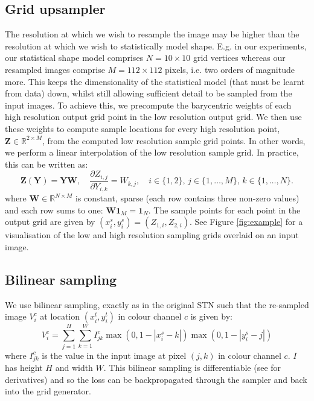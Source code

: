 \documentclass[runningheads]{llncs}
\newcommand{\R}{\mathbb{R}}
\begin{document}
\subsection{Grid upsampler}

The resolution at which we wish to resample the image may be higher than the resolution at which we wish to statistically model shape. E.g. in our experiments, our statistical shape model comprises $N = 10\times 10$ grid vertices whereas our resampled images comprise $M = 112\times 112$ pixels, i.e. two orders of magnitude more. This keeps the dimensionality of the statistical model (that must be learnt from data) down, whilst still allowing sufficient detail to be sampled from the input images. To achieve this, we precompute the barycentric weights of each high resolution output grid point in the low resolution output grid. We then use these weights to compute sample locations for every high resolution point, $\mathbf{Z}\in\R^{2\times M}$, from the computed low resolution sample grid points. In other words, we perform a linear interpolation of the low resolution sample grid. In practice, this can be written as:
\begin{equation}
    \mathbf{Z}(\mathbf{Y}) = \mathbf{YW},\quad  \frac{\partial Z_{i,j}}{\partial Y_{i,k}}=W_{k,j},\quad i\in\{1,2\},\, j\in\{1,\dots,M\},\, k\in\{1,\dots,N\}.
\end{equation}
where $\mathbf{W}\in\R^{N\times M}$ is constant, sparse (each row contains three non-zero values) and each row sums to one: $\mathbf{W1}_M=\mathbf{1}_N$.
The sample points for each point in the output grid are given by $(x_i^s,y_i^s)=(Z_{1,i},Z_{2,i})$. See Figure \ref{fig:example} for a visualisation of the low and high resolution sampling grids overlaid on an input image.

\subsection{Bilinear sampling}
We use bilinear sampling, exactly as in the original STN such that the re-sampled image $V_i^c$ at location $(x_i^t,y_i^t)$ in colour channel $c$ is given by:
\begin{equation*}
    V_i^c = \sum_{j=1}^H\sum_{k=1}^W I_{jk}^c \max(0,1-|x_i^s-k|)\max(0,1-|y_i^s-j|)
\end{equation*}
where $I_{jk}^c$ is the value in the input image at pixel $(j,k)$ in colour channel $c$. $I$ has height $H$ and width $W$. This bilinear sampling is differentiable (see \cite{jaderberg2015spatial} for derivatives) and so the loss can be backpropagated through the sampler and back into the grid generator.
\end{document}
